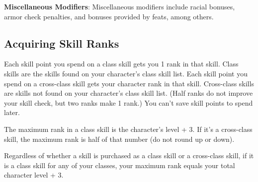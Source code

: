 \textbf{Miscellaneous Modifiers}: Miscellaneous modifiers include racial bonuses, armor check penalties, and bonuses provided by feats, among others.

\subsection{Acquiring Skill Ranks}
Each skill point you spend on a class skill gets you 1 rank in that skill. Class skills are the skills found on your character's class skill list. Each skill point you spend on a cross-class skill gets your character \onehalf rank in that skill. Cross-class skills are skills not found on your character's class skill list. (Half ranks do not improve your skill check, but two \onehalf ranks make 1 rank.) You can't save skill points to spend later.

The maximum rank in a class skill is the character's level + 3. If it's a cross-class skill, the maximum rank is half of that number (do not round up or down).

Regardless of whether a skill is purchased as a class skill or a cross-class skill, if it is a class skill for any of your classes, your maximum rank equals your total character level + 3.


